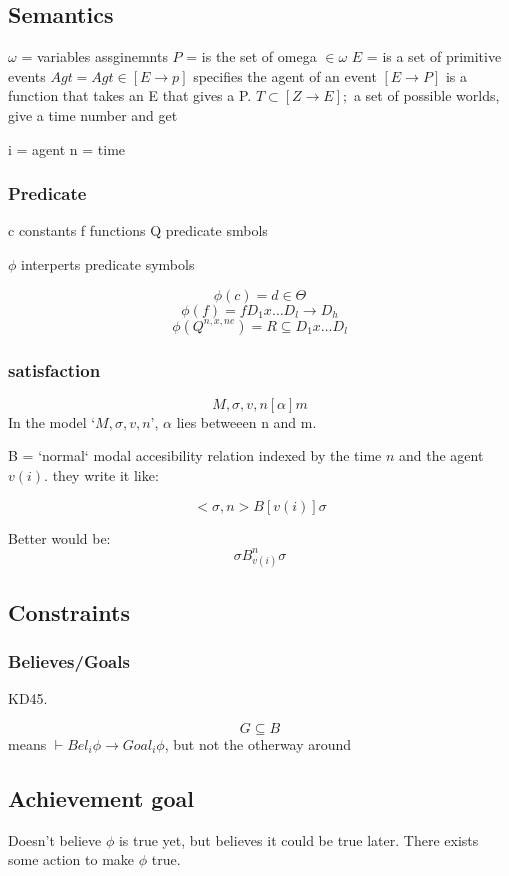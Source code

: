 \documentclass{article}
\begin{document}
\subsection{Semantics}
$\omega$ = variables assginemnts
$P$ = is the set of omega $\in \omega$
$E$ = is a set of primitive events
$Agt = Agt \in [E \to p]$ specifies the agent of an event $[E \to P]$ is a
function that takes an E that gives a P.
$T \subset [Z \to E];$ a set of possible worlds, give a time number and get

i = agent
n = time

\subsubsection{Predicate}
c constants
f functions
Q predicate smbols


$\phi$ interperts predicate symbols

\[\phi(c) = d \in \Theta\]
\[\phi(f) = f D_1x\dots D_l \to D_h\]
\[\phi(Q^{n,x,ne}) = R \subseteq D_1x\dots D_l \]

\subsubsection{satisfaction}

\[M,\sigma,v,n[\alpha] m\]
In the model `$M,\sigma,v,n$', $\alpha$ lies betweeen n and m.

B = `normal` modal accesibility relation indexed by the time $n$
and the agent $v(i)$. they write it like:

\[<\sigma, n>B[v(i)] \sigma\]

Better would be:
\[\sigma B_{v(i)}^n \sigma\]

\subsection{Constraints}
\subsubsection{Believes/Goals}
KD45.

\[G\subseteq B\]
means $\vdash {Bel}_i \phi \to {Goal}_i\phi$, but not the otherway around

\subsection{Achievement goal}
Doesn't believe $\phi$ is true yet, but believes it could be true later.
There exists some action to make $\phi$ true.
\end{document}
